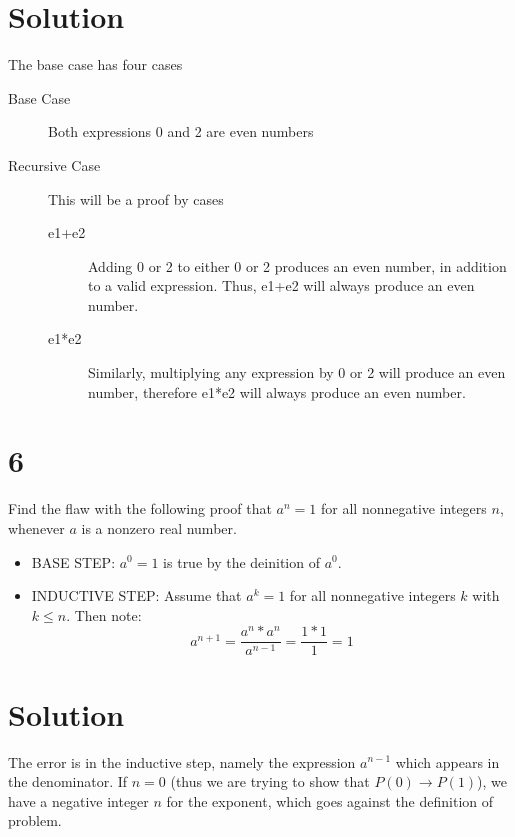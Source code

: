 \documentclass{article}
\begin{document}
\section*{Solution}
The base case has four cases
\begin{description}
\item[Base Case] Both expressions 0 and 2 are even numbers
\item[Recursive Case] This will be a proof by cases
	\begin{description}
	\item[e1+e2] Adding 0 or 2 to either 0 or 2 produces an even number, in addition to a valid expression. Thus, e1+e2 will always produce an even number.
	\item[e1*e2] Similarly, multiplying any expression by 0 or 2 will produce an even number, therefore e1*e2 will always produce an even number.
	\end{description}
\end{description}


\section*{6}
Find the flaw with the following proof that $a^n = 1$ for all nonnegative integers $n$, whenever $a$ is a nonzero real number.

\begin{itemize}
\item BASE STEP: $a^0 = 1$ is true by the deinition of $a^0$.
\item INDUCTIVE STEP: Assume that $a^k = 1$ for all nonnegative integers $k$ with $k\leq n$. Then note:
\[ a^{n+1} = \frac{a^n * a^n}{a^{n-1}} = \frac{1*1}{1} = 1\]
\end{itemize}

\section*{Solution}
The error is in the inductive step, namely the expression $a^{n-1}$ which appears in the denominator. If $n=0$ (thus we are trying to show that $P(0) \to P(1)$), we have a negative integer $n$ for the exponent, which goes against the definition of problem.
\end{document}
